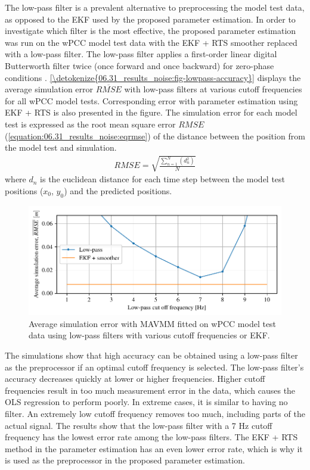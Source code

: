 The low-pass filter is a prevalent alternative to preprocessing the model test data, as opposed to the EKF used by the proposed parameter estimation.
In order to investigate which filter is the most effective, the proposed parameter estimation was run on the wPCC model test data with the EKF + RTS smoother replaced with a low-pass filter. The low-pass filter applies a first-order linear digital Butterworth filter twice (once forward and once backward) for zero-phase conditions \cite{virtanen_scipy_2020}. \hyperref[\detokenize{06.31_results_noise:fig-lowpass-accuracy}]{\autoref{\detokenize{06.31_results_noise:fig-lowpass-accuracy}}} displays the average simulation error \( \overline{RMSE} \) with low-pass filters at various cutoff frequencies for all wPCC model tests. Corresponding error with parameter estimation using EKF + RTS is also presented in the figure. The simulation error for each model test is expressed as the root mean square error \(RMSE\) (\autoref{equation:06.31_results_noise:eqrmse}) of the distance between the position from the model test and simulation.
\begin{equation}\label{equation:06.31_results_noise:eqrmse}
\begin{split}RMSE=\sqrt{ \frac{\sum_{n=1}^{N} (d_n^2) }{N}} \end{split}
\end{equation}
where \(d_n\) is the euclidean distance for each time step between the model test positions (\(x_0\), \(y_0\)) and the predicted positions.
\begin{figure}[h!]
\centering
\includegraphics[width=1.0\textwidth]{kappa/images/6.pdf}
\caption{Average simulation error with MAVMM fitted on wPCC model test data using low-pass filters with various cutoff frequencies or EKF.}\label{\detokenize{06.31_results_noise:fig-lowpass-accuracy}}\end{figure} 
\noindent The simulations show that high accuracy can be obtained using a low-pass filter as the preprocessor if an optimal cutoff frequency is selected. The low-pass filter's accuracy decreases quickly at lower or higher frequencies. Higher cutoff frequencies result in too much measurement error in the data, which causes the OLS regression to perform poorly. In extreme cases, it is similar to having no filter. An extremely low cutoff frequency removes too much, including parts of the actual signal. The results show that the low-pass filter with a 7 Hz cutoff frequency has the lowest error rate among the low-pass filters. The EKF + RTS method in the parameter estimation has an even lower error rate, which is why it is used as the preprocessor in the proposed parameter estimation.
